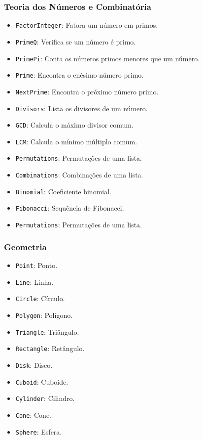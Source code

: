 \documentclass[a4paper, 12pt]{article}
\begin{document}
\subsubsection{Teoria dos Números e Combinatória}\label{teoria-dos-numeros-e-combinatoria}

\begin{itemize}
    \item \texttt{FactorInteger}: Fatora um número em primos.
    \item \texttt{PrimeQ}: Verifica se um número é primo.
    \item \texttt{PrimePi}: Conta os números primos menores que um número.
    \item \texttt{Prime}: Encontra o enésimo número primo.
    \item \texttt{NextPrime}: Encontra o próximo número primo.
    \item \texttt{Divisors}: Lista os divisores de um número.
    \item \texttt{GCD}: Calcula o máximo divisor comum.
    \item \texttt{LCM}: Calcula o mínimo múltiplo comum.
    \item \texttt{Permutations}: Permutações de uma lista.
    \item \texttt{Combinations}: Combinações de uma lista.
    \item \texttt{Binomial}: Coeficiente binomial.
    \item \texttt{Fibonacci}: Sequência de Fibonacci.
    \item \texttt{Permutations}: Permutações de uma lista.
\end{itemize}

\subsubsection{Geometria}\label{geometria}

\begin{itemize}
    \item \texttt{Point}: Ponto.
    \item \texttt{Line}: Linha.
    \item \texttt{Circle}: Círculo.
    \item \texttt{Polygon}: Polígono.
    \item \texttt{Triangle}: Triângulo.
    \item \texttt{Rectangle}: Retângulo.
    \item \texttt{Disk}: Disco.
    \item \texttt{Cuboid}: Cuboide.
    \item \texttt{Cylinder}: Cilindro.
    \item \texttt{Cone}: Cone.
    \item \texttt{Sphere}: Esfera.
\end{itemize}
\end{document}
